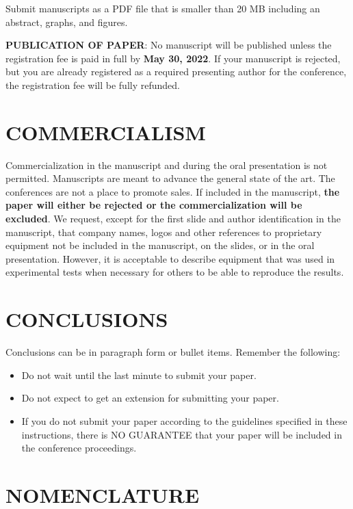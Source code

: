 \documentclass[10pt]{extarticle}
\begin{document}
Submit manuscripts as a PDF file that is smaller than 20 MB including an abstract, graphs, and figures.  

\textbf{PUBLICATION OF PAPER}: No manuscript will be published unless the registration fee is paid in full by \textbf{May 30, 2022}.  If your manuscript is rejected, but you are already registered as a required presenting author for the conference, the registration fee will be fully refunded.

\section{COMMERCIALISM}

Commercialization in the manuscript and during the oral presentation is not permitted.  Manuscripts are meant to advance the general state of the art.  The conferences are not a place to promote sales.  If included in the manuscript, \textbf{the paper will either be rejected or the commercialization will be excluded}.  We request, except for the first slide and author identification in the manuscript, that company names, logos and other references to proprietary equipment not be included in the manuscript, on the slides, or in the oral presentation.  However, it is acceptable to describe equipment that was used in experimental tests when necessary for others to be able to reproduce the results.

\section{CONCLUSIONS}

Conclusions can be in paragraph form or bullet items.  Remember the following:

\begin{itemize}
\itemsep-5pt
\item Do not wait until the last minute to submit your paper. 
\item Do not expect to get an extension for submitting your paper. 
\item If you do not submit your paper according to the guidelines specified in these instructions, there is NO GUARANTEE that your paper will be included in the conference proceedings.
\end{itemize}	

\section*{NOMENCLATURE}
\end{document}
